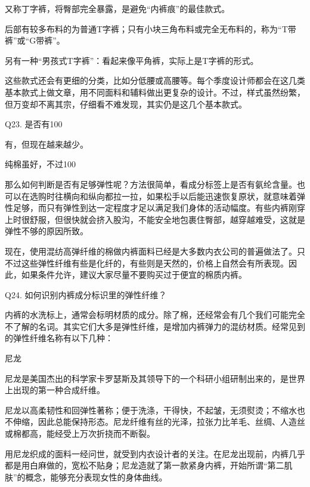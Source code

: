 \documentclass[12pt,UTF8]{ctexbook}
\begin{document}
又称丁字裤，将臀部完全暴露，是避免“内裤痕”的最佳款式。

后部有较多布料的为普通T字裤；只有小块三角布料或完全无布料的，称为“T带裤”或“G带裤”。

另有一种“男孩式T字裤”：看起来像平角裤，实际上是T字裤的形式。


这些款式还会有更细的分类，比如分低腰或高腰等。每个季度设计师都会在这几类基本款式上做文章，用不同面料和辅料做出更复杂的设计。不过，样式虽然纷繁，但万变却不离其宗，仔细看不难发现，其实仍是这几个基本款式。





Q23. 是否有100%


有，但现在越来越少。

纯棉虽好，不过100%

那么如何判断是否有足够弹性呢？方法很简单，看成分标签上是否有氨纶含量。也可以在选购时往横向和纵向都拉一拉，如果松手以后能迅速恢复原状，就意味着弹性足够，而只有弹性到达一定程度才足以满足我们身体的活动幅度。有些内裤刚穿上时很舒服，但很快就会挤入股沟，不能安全地包裹住臀部，越穿越难受，这就是弹性不够的原因所致。

现在，使用混纺高弹纤维的棉做内裤面料已经是大多数内衣公司的普遍做法了。只不过这些弹性纤维有些是化纤的，有些则是天然的，价格上自然会有所表现。因此，如果条件允许，建议大家尽量不要购买过于便宜的棉质内裤。





Q24. 如何识别内裤成分标识里的弹性纤维？


内裤的水洗标上，通常会标明材质的成分。除了棉，还经常会有几个我们可能完全不了解的名词。其实它们大多是弹性纤维，是增加内裤弹力的混纺材质。经常见到的弹性纤维名称有以下几种：

尼龙

尼龙是美国杰出的科学家卡罗瑟斯及其领导下的一个科研小组研制出来的，是世界上出现的第一种合成纤维。

尼龙以高柔韧性和回弹性著称；便于洗涤，干得快，不起皱，无须熨烫；不缩水也不伸缩，因此总能保持形态。尼龙纤维有丝的光泽，拉张力比羊毛、丝绸、人造丝或棉都高，能经受上万次折挠而不断裂。

用尼龙织成的面料一经问世，就受到内衣设计者的关注。在尼龙出现前，内裤几乎都是用白麻做的，宽松不贴身；尼龙造就了第一款紧身内裤，开始所谓“第二肌肤”的概念，能够充分表现女性的身体曲线。
\end{document}
